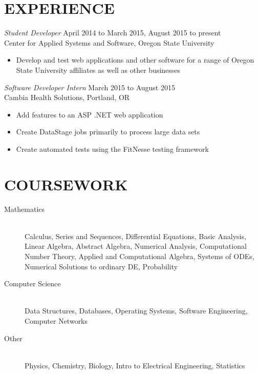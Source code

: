 \documentclass[margin]{res}
\begin{document}
\begin{resume}
\section{EXPERIENCE} {\sl Student Developer} \hfill April 2014 to                  March 2015, August 2015 to present \\
                Center for Applied Systems and Software, Oregon State University
                 \begin{itemize}  \itemsep -2pt %
                 \item Develop and test web applications and other software for a range of Oregon State University affiliates as well as other businesses


                \end{itemize}
 
                {\sl Software Developer Intern} \hfill            March 2015 to August 2015 \\
                Cambia Health Solutions, Portland, OR 
                 \begin{itemize}  \itemsep -2pt %
                 \item Add features to an ASP .NET web application
                 \item Create DataStage jobs primarily to process large data sets
                 \item Create automated tests using the FitNesse testing framework
                 \end{itemize} 
                   
\section{COURSEWORK}
    \begin{description}
                  \item[Mathematics] \hfill \\
                  Calculus, Series and Sequences, Differential Equations, Basic Analysis, Linear Algebra, Abstract Algebra, Numerical Analysis, Computational Number Theory, Applied and Computational Algebra, Systems of ODEs, Numerical Solutions to ordinary DE, Probability
                  \item[Computer Science] \hfill \\
                  Data Structures, Databases, Operating Systems, Software Engineering, Computer Networks
                  \item[Other] \hfill \\
                  Physics, Chemistry, Biology, Intro to Electrical Engineering, Statistics
                \end{description}


\end{resume}
\end{document}

